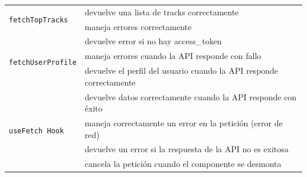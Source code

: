 \begin{longtable}{|p{5cm}|p{9cm}|}
    \multirow{2}{*}{\texttt{fetchTopTracks}}   & devuelve una lista de tracks correctamente                                    \\ \cline{2-2}
                                               & maneja errores correctamente                                                  \\ \hline


    \multirow{3}{*}{\texttt{fetchUserProfile}} & devuelve error si no hay access\_token                                        \\ \cline{2-2}
                                               & maneja errores cuando la API responde con fallo                               \\ \cline{2-2}
                                               & devuelve el perfil del usuario cuando la API responde correctamente           \\ \hline


    \multirow{4}{*}{\texttt{useFetch Hook}}    & devuelve datos correctamente cuando la API responde con éxito                 \\ \cline{2-2}
                                               & maneja correctamente un error en la petición (error de red)                   \\ \cline{2-2}
                                               & devuelve un error si la respuesta de la API no es exitosa                     \\ \cline{2-2}
                                               & cancela la petición cuando el componente se desmonta                          \\ \hline
\end{longtable}




